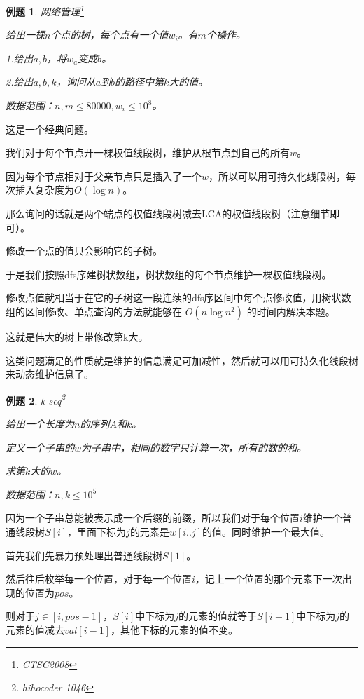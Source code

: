 \documentclass[a4paper]{article}
\newtheorem{problem}{例题}
\begin{document}
\begin{problem}
  网络管理\footnote{CTSC2008}

  给出一棵$n$个点的树，每个点有一个值$w_i$。有$m$个操作。

  1.给出$a,b$，将$w_a$变成$b$。

  2.给出$a,b,k$，询问从$a$到$b$的路径中第$k$大的值。

  数据范围：$n,m\leq 80000, w_i\leq 10^8$。
\end{problem}

这是一个经典问题。

我们对于每个节点开一棵权值线段树，维护从根节点到自己的所有$w$。

因为每个节点相对于父亲节点只是插入了一个$w$，所以可以用可持久化线段树，每次插入复杂度为$O(\log n)$。

那么询问的话就是两个端点的权值线段树减去LCA的权值线段树（注意细节即可）。

修改一个点的值只会影响它的子树。

于是我们按照dfs序建树状数组，树状数组的每个节点维护一棵权值线段树。

修改点值就相当于在它的子树这一段连续的dfs序区间中每个点修改值，用树状数组的区间修改、单点查询的方法就能够在 $O(n\log n^2)$ 的时间内解决本题。

\sout{这就是伟大的树上带修改第k大。}

\bigskip

这类问题满足的性质就是维护的信息满足可加减性，然后就可以用可持久化线段树来动态维护信息了。

\begin{problem}
  k seq\footnote{hihocoder 1046}

  给出一个长度为$n$的序列$A$和$k$。

  定义一个子串的$w$为子串中，相同的数字只计算一次，所有的数的和。

  求第$k$大的$w$。

  数据范围：$n, k\leq 10^5$
\end{problem}

因为一个子串总能被表示成一个后缀的前缀，所以我们对于每个位置$i$维护一个普通线段树$S[i]$，里面下标为$j$的元素是$w[i..j]$的值。同时维护一个最大值。

首先我们先暴力预处理出普通线段树$S[1]$。

然后往后枚举每一个位置，对于每一个位置$i$，记上一个位置的那个元素下一次出现的位置为$pos$。

则对于$j\in [i, pos - 1]$，$S[i]$中下标为$j$的元素的值就等于$S[i-1]$中下标为$j$的元素的值减去$val[i-1]$，其他下标的元素的值不变。
\end{document}
